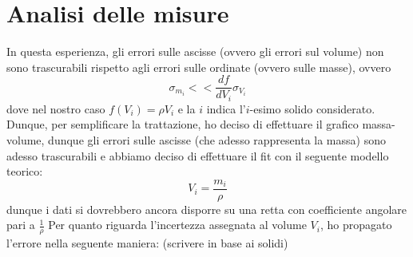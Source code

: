 \documentclass{article}
\begin{document}
\section{Analisi delle misure}
In questa esperienza, gli errori sulle ascisse (ovvero gli errori sul volume) non sono trascurabili rispetto agli errori sulle ordinate (ovvero sulle masse), ovvero
$$
	\sigma_{m_i} << \frac{df}{dV_i} \sigma_{V_i}
$$
dove nel nostro caso $f(V_i) = \rho V_i$ e la $i$ indica l'$i$-esimo solido considerato. \\
Dunque, per semplificare la trattazione, ho deciso di effettuare il grafico massa-volume, dunque gli errori sulle ascisse (che adesso rappresenta la massa) sono adesso trascurabili e abbiamo deciso di effettuare il fit con il seguente modello teorico:
$$
	V_i = \frac{m_i}{\rho}
$$
dunque i dati si dovrebbero ancora disporre su una retta con coefficiente angolare pari a $\frac{1}{\rho}$
Per quanto riguarda l'incertezza assegnata al volume $V_i$, ho propagato l'errore nella seguente maniera: (scrivere in base ai solidi)
\end{document}

